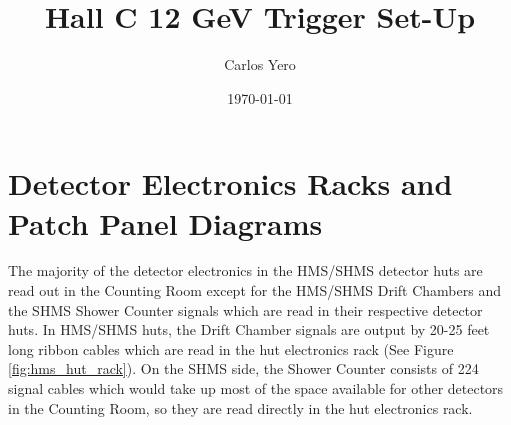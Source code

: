 \documentclass[11pt]{article}
\begin{document}
\newcommand{\hhodthrs}{-44.5 mV }       %
\newcommand{\hhodgate}{60 ns }
\newcommand{\hPrShLo}{-40 mV }
\newcommand{\hPrShHi}{-60 mV }
\newcommand{\hSHLo}{-45 mV }
\newcommand{\hPrShLogate}{30 ns }
\newcommand{\hPrShHigate}{30 ns }
\newcommand{\hSHLogate}{30 ns }
\newcommand{\hcerthrs}{-50 mV }
\newcommand{\hcergate}{30 ns }

\newcommand{\shodthrs}{-30 mV }
\newcommand{\quartzthrs}{-60 mV }
\newcommand{\shodgate}{60 ns } 
\newcommand{\sngcthrs}{-50 mV}
\newcommand{\sngcgate}{30 ns}
\newcommand{\shgcthrs}{-50 mV}
\newcommand{\shgcgate}{30 ns}
\newcommand{\saerthrs}{-50 mV}
\newcommand{\saergate}{30 ns}

\title{\Large \bf{Hall C 12 GeV Trigger Set-Up}}

\author{Carlos Yero}

\date{\today}
\maketitle



\section{Detector Electronics Racks and Patch Panel Diagrams}
The majority of the detector electronics in the HMS/SHMS detector huts are read out in the Counting Room except for the HMS/SHMS Drift
Chambers and the SHMS Shower Counter signals which are read in their respective detector huts. In HMS/SHMS huts, the Drift
Chamber signals are output by 20-25 feet long ribbon cables which are read in the hut electronics rack (See Figure \ref{fig:hms_hut_rack}). On the SHMS
side, the Shower Counter consists of 224 signal cables which would take up most of the space available for other detectors
in the Counting Room, so they are read directly in the hut electronics rack.
\end{document}
